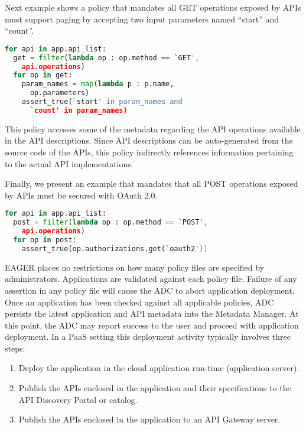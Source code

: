 Next example shows a policy that mandates all GET operations exposed by APIs must support
paging by accepting two input parameters named ``start'' and ``count''. 

\vspace{0.05in}
{\footnotesize
\begin{lstlisting}[language=Python, frame=single, showstringspaces=false]
for api in app.api_list:
  get = filter(lambda op : op.method == `GET',  
    api.operations)
  for op in get:
    param_names = map(lambda p : p.name, 
      op.parameters)
    assert_true(`start' in param_names and 
      `count' in param_names)
\end{lstlisting}
}
\vspace{0.05in}

This policy accesses some of the metadata regarding the API operations available in the API descriptions.
Since API descriptions can be auto-generated from the source code of the APIs, this policy indirectly
references information pertaining to the actual API implementations.

Finally, we present an example that mandates that all POST operations exposed by APIs must be
secured with OAuth 2.0.

\vspace{0.05in}
{\footnotesize
\begin{lstlisting}[language=Python, frame=single, showstringspaces=false]
for api in app.api_list:
  post = filter(lambda op : op.method == `POST', 
  	api.operations)
  for op in post:
    assert_true(op.authorizations.get(`oauth2'))
\end{lstlisting}
}
\vspace{0.05in}

EAGER places no restrictions on how many policy files are specified by 
administrators. Applications are validated against each policy file. Failure
of any assertion in any policy file will cause the ADC to abort 
application deployment. Once an application has been checked against all
applicable policies, ADC persists the latest application and API metadata into
the Metadata Manager.  At this point, the ADC may report success to the user
and proceed with application deployment. In a PaaS setting
this deployment activity typically involves three steps:

\begin{enumerate}
\vspace{0.05in}
\item Deploy the application in the cloud application run-time (application server).
\vspace{0.05in}
\item Publish the APIs enclosed in the application and their specifications to
the API Discovery Portal or catalog.
\vspace{0.05in}
\item Publish the APIs enclosed in the application to an API Gateway server.
\vspace{0.05in}
\end{enumerate}

